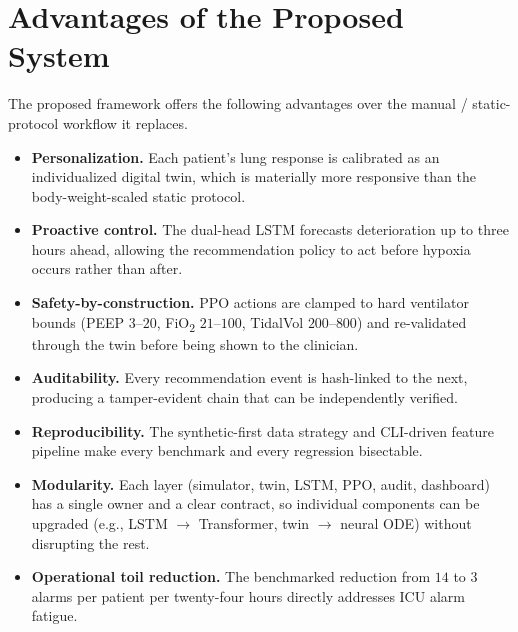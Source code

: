 \documentclass[12pt,a4paper,oneside]{report}
\begin{document}
\section{Advantages of the Proposed System}
The proposed framework offers the following advantages over the manual / static-protocol workflow it replaces.
\begin{itemize}[leftmargin=*]
  \item \textbf{Personalization.} Each patient's lung response is calibrated as an individualized digital twin, which is materially more responsive than the body-weight-scaled static protocol.
  \item \textbf{Proactive control.} The dual-head LSTM forecasts deterioration up to three hours ahead, allowing the recommendation policy to act before hypoxia occurs rather than after.
  \item \textbf{Safety-by-construction.} PPO actions are clamped to hard ventilator bounds (PEEP $3$--$20$, FiO\textsubscript{2} $21$--$100$, TidalVol $200$--$800$) and re-validated through the twin before being shown to the clinician.
  \item \textbf{Auditability.} Every recommendation event is hash-linked to the next, producing a tamper-evident chain that can be independently verified.
  \item \textbf{Reproducibility.} The synthetic-first data strategy and CLI-driven feature pipeline make every benchmark and every regression bisectable.
  \item \textbf{Modularity.} Each layer (simulator, twin, LSTM, PPO, audit, dashboard) has a single owner and a clear contract, so individual components can be upgraded (e.g., LSTM $\rightarrow$ Transformer, twin $\rightarrow$ neural ODE) without disrupting the rest.
  \item \textbf{Operational toil reduction.} The benchmarked reduction from $14$ to $3$ alarms per patient per twenty-four hours directly addresses ICU alarm fatigue.
\end{itemize}
\end{document}
